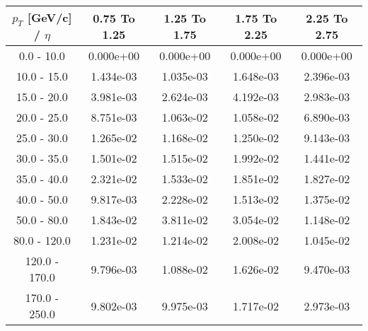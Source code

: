 \begin{tabular}{|c|c|c|c|c|}\hline 
$p_T$ [GeV/c] / $\eta$  & 0.75 To 1.25 & 1.25 To 1.75 & 1.75 To 2.25 & 2.25 To 2.75 \\ 
 \hline 
0.0 - 10.0 & 0.000e+00 & 0.000e+00 & 0.000e+00 & 0.000e+00 \\ 
10.0 - 15.0 & 1.434e-03 & 1.035e-03 & 1.648e-03 & 2.396e-03 \\ 
15.0 - 20.0 & 3.981e-03 & 2.624e-03 & 4.192e-03 & 2.983e-03 \\ 
20.0 - 25.0 & 8.751e-03 & 1.063e-02 & 1.058e-02 & 6.890e-03 \\ 
25.0 - 30.0 & 1.265e-02 & 1.168e-02 & 1.250e-02 & 9.143e-03 \\ 
30.0 - 35.0 & 1.501e-02 & 1.515e-02 & 1.992e-02 & 1.441e-02 \\ 
35.0 - 40.0 & 2.321e-02 & 1.533e-02 & 1.851e-02 & 1.827e-02 \\ 
40.0 - 50.0 & 9.817e-03 & 2.228e-02 & 1.513e-02 & 1.375e-02 \\ 
50.0 - 80.0 & 1.843e-02 & 3.811e-02 & 3.054e-02 & 1.148e-02 \\ 
80.0 - 120.0 & 1.231e-02 & 1.214e-02 & 2.008e-02 & 1.045e-02 \\ 
120.0 - 170.0 & 9.796e-03 & 1.088e-02 & 1.626e-02 & 9.470e-03 \\ 
170.0 - 250.0 & 9.802e-03 & 9.975e-03 & 1.717e-02 & 2.973e-03 \\ 
 \hline 
\end{tabular} 
